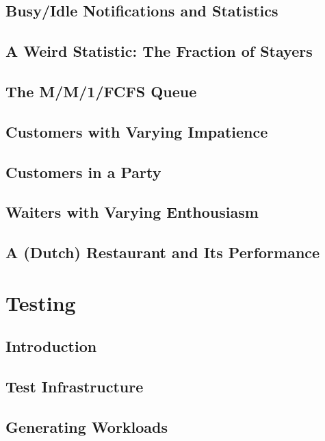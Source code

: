 \documentclass[12pt]{book}
\begin{document}
\section{Busy/Idle Notifications and Statistics}

\section{A Weird Statistic: The Fraction of Stayers}

\section{The M/M/1/FCFS Queue}

\section{Customers with Varying Impatience}

\section{Customers in a Party}

\section{Waiters with Varying Enthousiasm}

\section{A (Dutch) Restaurant and Its Performance}

\chapter{Testing}

\section{Introduction}

\section{Test Infrastructure}

\section{Generating Workloads}
\end{document}
